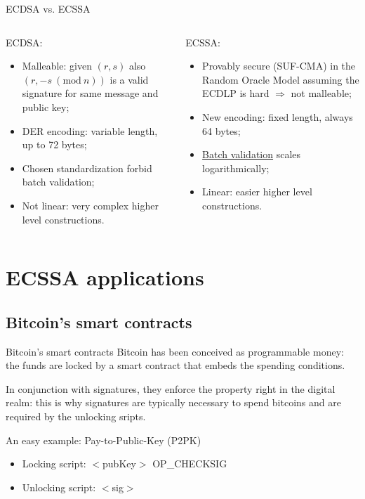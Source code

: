 \documentclass[slidescentered]{beamer}
\begin{document}
	\begin{frame}{ECDSA vs. ECSSA}
		\begin{columns}
			\begin{column}{0.5\linewidth}
				ECDSA:
				\begin{itemize}
					\item<2 -> Malleable: given $(r, s)$ also $(r, -s \ (\text{mod} \ n))$ is a valid signature for same message and public key;
					\item<3 -> DER encoding: variable length, up to 72 bytes;
					\item<4 -> Chosen standardization forbid batch validation;
					\item<5 -> Not linear: very complex higher level constructions.
				\end{itemize}
			\end{column}
			\begin{column}{0.5\linewidth}
				ECSSA:
				\begin{itemize}
					\item<2 -> Provably secure (SUF-CMA) in the Random Oracle Model assuming the ECDLP is hard $\Longrightarrow$ not malleable;
					\item<3 -> New encoding: fixed length, always 64 bytes;
					\item<4 -> \hyperlink{batch_validation}{Batch validation} scales logarithmically;
					\item<5 -> Linear: easier higher level constructions.
				\end{itemize}
			\end{column}
		\end{columns}
	\end{frame}
	
	\section{ECSSA applications}
	
	\subsection{Bitcoin's smart contracts}
	\begin{frame}{Bitcoin's smart contracts}
		Bitcoin has been conceived as programmable money: the funds are locked by a smart contract that embeds the spending conditions.
		
		\bigskip
		\noindent
		In conjunction with signatures, they enforce the property right in the digital realm: this is why signatures are typically necessary to spend bitcoins and are required by the unlocking sripts.
		
		\bigskip
		\noindent
		\begin{block}{An easy example: Pay-to-Public-Key (P2PK)}
			\begin{itemize}
				\item Locking script: $<$pubKey$>$ OP\_CHECKSIG
				\item Unlocking script: $<$sig$>$
			\end{itemize}
		\end{block}
	\end{frame}
	
\end{document}
